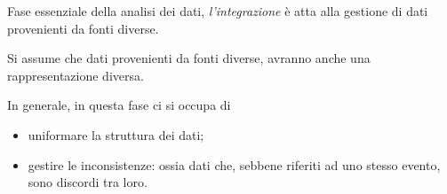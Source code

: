 \documentclass{subfiles}
\begin{document}
Fase essenziale della analisi dei dati, \emph{l'integrazione} è atta alla gestione di dati provenienti da fonti diverse.
\begin{MarginNote}
    Si assume che dati provenienti da fonti diverse, avranno anche una rappresentazione diversa.
\end{MarginNote}
In generale, in questa fase ci si occupa di
\begin{itemize}
    \item uniformare la struttura dei dati;
    \item gestire le inconsistenze: ossia dati che, sebbene riferiti ad uno stesso evento, sono discordi tra loro.
\end{itemize}
\end{document}
